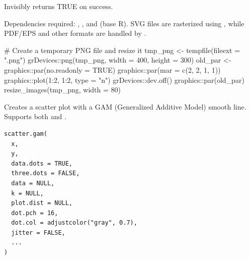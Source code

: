 \documentclass[a4paper]{book}
\begin{document}
%
\begin{Value}
Invisibly returns TRUE on success.
\end{Value}
%
\begin{Note}
Dependencies required: , , and  (base R).
SVG files are rasterized using , while PDF/EPS and other
formats are handled by .
\end{Note}
%
\begin{Examples}
\begin{ExampleCode}

# Create a temporary PNG file and resize it
tmp_png <- tempfile(fileext = ".png")
grDevices::png(tmp_png, width = 400, height = 300)
old_par <- graphics::par(no.readonly = TRUE)
graphics::par(mar = c(2, 2, 1, 1))
graphics::plot(1:2, 1:2, type = "n")
grDevices::dev.off()
graphics::par(old_par)
resize_images(tmp_png, width = 80)


\end{ExampleCode}
\end{Examples}
%
\begin{Description}
Creates a scatter plot with a GAM (Generalized Additive Model) smooth line.
Supports both  and .
\end{Description}
%
\begin{Usage}
\begin{verbatim}
scatter.gam(
  x,
  y,
  data.dots = TRUE,
  three.dots = FALSE,
  data = NULL,
  k = NULL,
  plot.dist = NULL,
  dot.pch = 16,
  dot.col = adjustcolor("gray", 0.7),
  jitter = FALSE,
  ...
)
\end{verbatim}
\end{Usage}
%
\end{document}
